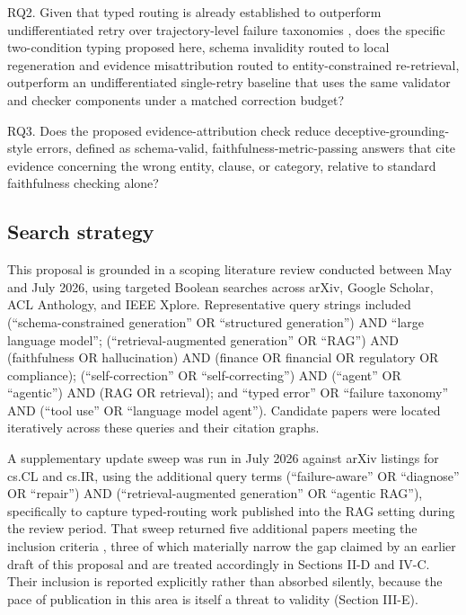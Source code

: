 \documentclass[10pt,twocolumn,letterpaper]{article}
\begin{document}
RQ2. Given that typed routing is already established to outperform undifferentiated retry over trajectory-level failure taxonomies \cite{paladin,doctorrag}, does the specific two-condition typing proposed here, schema invalidity routed to local regeneration and evidence misattribution routed to entity-constrained re-retrieval, outperform an undifferentiated single-retry baseline that uses the same validator and checker components under a matched correction budget?

RQ3. Does the proposed evidence-attribution check reduce deceptive-grounding-style errors, defined as schema-valid, faithfulness-metric-passing answers that cite evidence concerning the wrong entity, clause, or category, relative to standard faithfulness checking alone?

\subsection{Search strategy}

This proposal is grounded in a scoping literature review conducted between May and July 2026, using targeted Boolean searches across arXiv, Google Scholar, ACL Anthology, and IEEE Xplore. Representative query strings included (``schema-constrained generation'' OR ``structured generation'') AND ``large language model''; (``retrieval-augmented generation'' OR ``RAG'') AND (faithfulness OR hallucination) AND (finance OR financial OR regulatory OR compliance); (``self-correction'' OR ``self-correcting'') AND (``agent'' OR ``agentic'') AND (RAG OR retrieval); and ``typed error'' OR ``failure taxonomy'' AND (``tool use'' OR ``language model agent''). Candidate papers were located iteratively across these queries and their citation graphs.

A supplementary update sweep was run in July 2026 against arXiv listings for cs.CL and cs.IR, using the additional query terms (``failure-aware'' OR ``diagnose'' OR ``repair'') AND (``retrieval-augmented generation'' OR ``agentic RAG''), specifically to capture typed-routing work published into the RAG setting during the review period. That sweep returned five additional papers meeting the inclusion criteria \cite{doctorrag,skillrag,budgetrepair,ragerrors,refwalk}, three of which materially narrow the gap claimed by an earlier draft of this proposal and are treated accordingly in Sections II-D and IV-C. Their inclusion is reported explicitly rather than absorbed silently, because the pace of publication in this area is itself a threat to validity (Section III-E).
\end{document}
